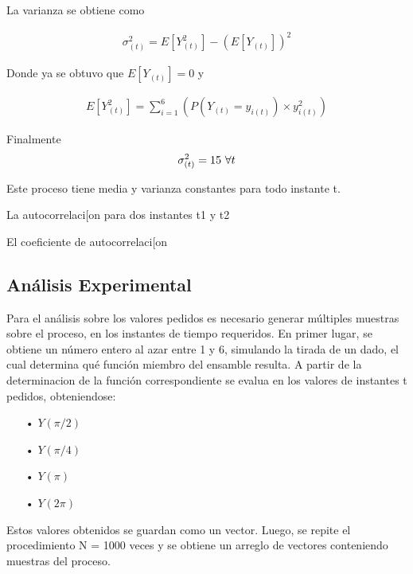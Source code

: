 La varianza se obtiene como

\begin{equation*}
\begin{gathered}
	\sigma^{2}_{(t)} = E\left[Y_{(t)}^{2}\right]- \left(E\left[Y_{(t)}\right]\right)^{2}  
\end{gathered}
\end{equation*}

Donde ya se obtuvo que $E\left[Y_{(t)}\right] = 0$ y 

\begin{equation*}
\begin{gathered}
	E\left[Y_{(t)}^{2}\right] = \sum_{i=1}^{6}\left( P(Y_{(t)} = y_{i(t)}) \times y_{i(t)}^{2}\right) 
\end{gathered}
\end{equation*}

Finalmente
\begin{equation*}
\begin{gathered}
	\sigma^{2}_{(t)} = 15 $   $ \forall t  
\end{gathered}
\end{equation*}

Este proceso tiene media y varianza constantes para todo instante t.

La autocorrelaci[on para dos instantes t1 y t2


El coeficiente de autocorrelaci[on 


\subsection{Análisis Experimental}

Para el análisis sobre los valores pedidos es necesario generar múltiples muestras sobre el proceso, en los instantes de tiempo requeridos. En primer lugar, se obtiene un número entero al azar entre 1 y 6, simulando la tirada de un dado, el cual determina qué función miembro del ensamble resulta.
A partir de la determinacion de la función correspondiente se evalua en los valores de instantes t pedidos, obteniendose:

\begin{enumerate}
   \item[•] $Y(\pi/2)$
   \item[•] $Y(\pi/4)$
   \item[•] $Y(\pi)$
   \item[•] $Y(2\pi)$
\end{enumerate}

Estos valores obtenidos se guardan como un vector. Luego, se repite el procedimiento N = 1000 veces 
y se obtiene un arreglo de vectores conteniendo muestras del proceso.

